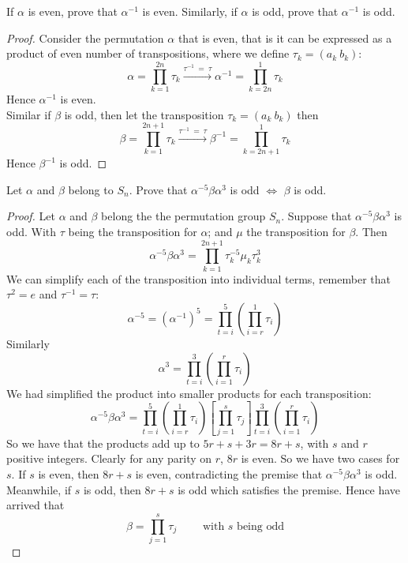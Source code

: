 \begin{assignment}[
  header=HeaderA,
  body=BodyA,
  title={Homework 3},
  duedate={26 February, 2026},
  toc=false,
  toctitle={This appears on the Table of contents.},
  exlist=false
]

\begin{exer}[Problem 5.12]
If $\alpha$ is even, prove that $\alpha^{-1}$ is even. Similarly, if $\alpha$ is odd, prove that $\alpha^{-1}$ is odd.
\begin{proof}
Consider the permutation $\alpha$ that is even, that is it can be expressed as a product of even number of transpositions, where we define $\tau_k = (a_k\ b_k)$:
\[
\alpha = \prod_{k=1}^{2n} \tau_k \xrightarrow{\tau^{-1}\ =\ \tau}  \alpha^{-1} = \prod_{k=2n}^{1} \tau_k 
\]
Hence $\alpha^{-1}$ is even.\\

Similar if $\beta$ is odd, then let the transposition $\tau_k = (a_k\ b_k)$ then
\[
\beta = \prod_{k=1}^{2n+1} \tau_k \xrightarrow{\tau^{-1}\ = \ \tau} \beta^{-1} = \prod_{k=2n+1}^{1} \tau_k
\]
Hence $\beta^{-1}$ is odd.
\end{proof}   
\end{exer}


\begin{exer}[Problem 5.19]
Let $\alpha$ and $\beta$ belong to $S_n$. Prove that $\alpha^{-5}\beta\alpha^3$ is odd $\iff$ $\beta$ is odd.
\begin{proof}
Let $\alpha$ and $\beta$ belong the the permutation group $S_n$. Suppose that $\alpha^{-5}\beta\alpha^3$ is odd. With $\tau$ being the transposition for $\alpha$; and $\mu$ the transposition for $\beta$. Then
\[
\alpha^{-5}\beta\alpha^3 = \prod_{k=1}^{2n+1} \tau_k^{-5}\mu_k\tau_k^{3}
\]
We can simplify each of the transposition into individual terms, remember that $\tau^2 = e$ and $\tau^{-1}=\tau$:
\[
\alpha^{-5} = \left(\alpha^{-1}\right)^5 = \prod_{t=i}^{5}\left(\prod_{i=r}^1 \tau_i\right) 
\]
Similarly
\[
\alpha^{3} = \prod_{t=i}^{3}\left(\prod_{i=1}^r \tau_i\right)
\]
We had simplified the product into smaller products for each transposition:
\[
\alpha^{-5}\beta\alpha^3 = \prod_{t=i}^{5}\left(\prod_{i=r}^1 \tau_i\right) \left[ \prod_{j=1}^s \tau_j \right] \prod_{t=i}^{3}\left(\prod_{i=1}^r \tau_i\right)
\]
So we have that the products add up to $5r + s + 3r = 8r + s$, with $s$ and $r$ positive integers. Clearly for any parity on $r$, $8r$ is even. So we have two cases for $s$. If $s$ is even, then $8r+s$ is even, contradicting the premise that $\alpha^{-5}\beta\alpha^3$ is odd. Meanwhile, if $s$ is odd, then $8r + s$ is odd which satisfies the premise. Hence have arrived that
\[
\beta = \prod_{j=1}^{s} \tau_j \quad \quad \text{ with } s \text{ being odd}
\]


\end{proof}
\end{exer}
\end{assignment}

